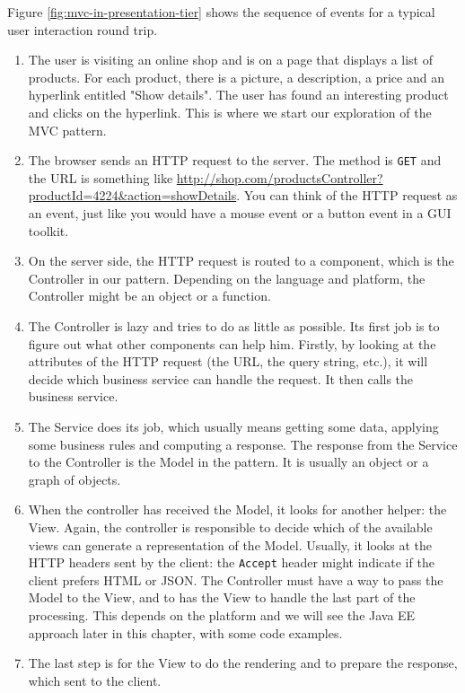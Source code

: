 Figure \ref{fig:mvc-in-presentation-tier} shows the sequence of events for a typical user interaction round trip.
\begin{enumerate}
\item The user is visiting an online shop and is on a page that displays a list of products. For each product, there is a picture, a description, a price and an hyperlink entitled "Show details". The user has found an interesting product and clicks on the hyperlink. This is where we start our exploration of the \ac{MVC} pattern.
\item The browser sends an HTTP request to the server. The method is \texttt{GET} and the URL is something like \url{http://shop.com/productsController?productId=4224&action=showDetails}. You can think of the HTTP request as an event, just like you would have a mouse event or a button event in a GUI toolkit.
\item On the server side, the HTTP request is routed to a component, which is the Controller in our pattern. Depending on the language and platform, the Controller might be an object or a function.
\item The Controller is lazy and tries to do as little as possible. Its first job is to figure out what other components can help him. Firstly, by looking at the attributes of the HTTP request (the URL, the query string, etc.), it will decide which business service can handle the request. It then calls the business service.
\item The Service does its job, which usually means getting some data, applying some business rules and computing a response. The response from the Service to the Controller is the Model in the pattern. It is usually an object or a graph of objects.
\item When the controller has received the Model, it looks for another helper: the View. Again, the controller is responsible to decide which of the available views can generate a representation of the Model. Usually, it looks at the HTTP headers sent by the client: the \texttt{Accept} header might indicate if the client prefers HTML or JSON. The Controller must have a way to pass the Model to the View, and to has the View to handle the last part of the processing. This depends on the platform and we will see the Java EE approach later in this chapter, with some code examples.
\item The last step is for the View to do the rendering and to prepare the response, which sent to the client.
\end{enumerate}

